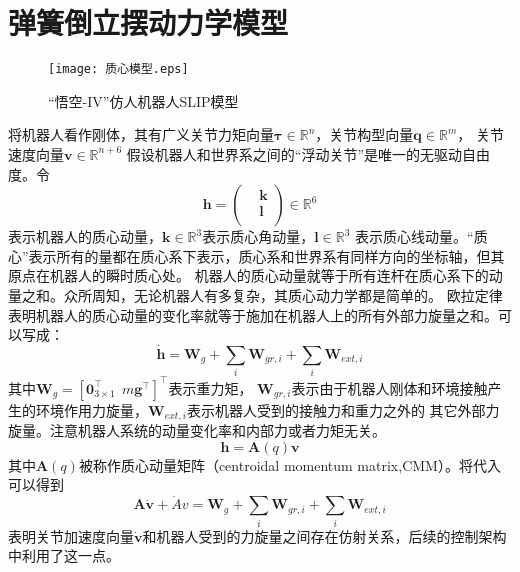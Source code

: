 \section{弹簧倒立摆动力学模型}
\label{sec:dynamics}
\begin{figure}[htbp]
    \centering
    \texttt{[image: 质心模型.eps]}
    \caption{\label{fig:com_model}“悟空-IV”仿人机器人SLIP模型}
\end{figure}
将机器人看作刚体，其有广义关节力矩向量$\boldsymbol{\tau} \in {{\mathbb{R}}^{n}}$，关节构型向量$\boldsymbol{q}\in {{\mathbb{R}}^{m}}$，
关节速度向量$\boldsymbol{v}\in {{\mathbb{R}}^{n+6}}$
假设机器人和世界系之间的“浮动关节”是唯一的无驱动自由度。令
\begin{equation}
    \label{equ:momentum}
    \boldsymbol{h}=\left(\begin{aligned}
        & \boldsymbol{k} \\ 
       & \boldsymbol{l} \\ 
      \end{aligned} \right)\in \mathbb{R}^{6}
\end{equation}
表示机器人的质心动量，$\boldsymbol{k}\in {{\mathbb{R}}^{3}}$表示质心角动量，$\boldsymbol{l}\in {{\mathbb{R}}^{3}}$
表示质心线动量。“质心”表示所有的量都在质心系下表示，质心系和世界系有同样方向的坐标轴，但其原点在机器人的瞬时质心处。
机器人的质心动量就等于所有连杆在质心系下的动量之和。众所周知，无论机器人有多复杂，其质心动力学都是简单的。
欧拉定律表明机器人的质心动量的变化率就等于施加在机器人上的所有外部力旋量之和。可以写成：
\begin{equation}
    \label{equ:euler's_law}
    \dot{\boldsymbol{h}}={{\boldsymbol{W}}_{g}}+\sum\limits_{i}{{{\boldsymbol{W}}_{gr,i}}}+\sum\limits_{i}{{{\boldsymbol{W}}_{ext,i}}}
\end{equation}
其中${{\boldsymbol{W}}_{g}}={{[\mathbf{0}_{3\times 1}^{\top }\ \ m{{\mathbf{g}}^{\top }}]}^{\top }}$表示重力矩，
${\boldsymbol{W}}_{gr,i}$表示由于机器人刚体和环境接触产生的环境作用力旋量，${\boldsymbol{W}}_{ext,i}$表示机器人受到的接触力和重力之外的
其它外部力旋量。注意机器人系统的动量变化率和内部力或者力矩无关。
\begin{equation}
    \label{equ:euler_linear_equ}
    \boldsymbol{h}=\boldsymbol{A}(q)\boldsymbol{v}
\end{equation}
其中$\boldsymbol{A}(q)$被称作质心动量矩阵（centroidal momentum matrix,CMM）。将代入可以得到
\begin{equation}
    \label{equ:euler_wrench}
    \boldsymbol{A}\dot{\boldsymbol{v}}+\dot{A}v={{\boldsymbol{W}}_{g}}+\sum\limits_{i}{{{\boldsymbol{W}}_{gr,i}}}
    +\sum\limits_{i}{{{\boldsymbol{W}}_{ext,i}}}
\end{equation}
表明关节加速度向量$\dot{\boldsymbol{v}}$和机器人受到的力旋量之间存在仿射关系，后续的控制架构中利用了这一点。
